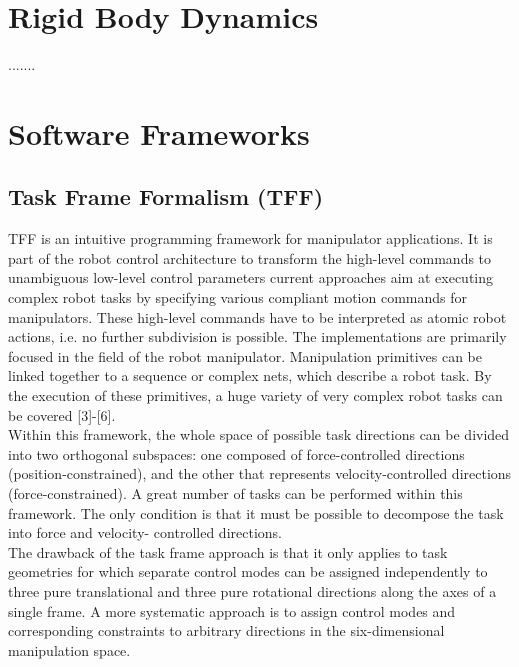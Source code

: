 \section{Rigid Body Dynamics}{.......}

\section{Software Frameworks}

\subsection{Task Frame Formalism (TFF)}

TFF is an intuitive programming framework for manipulator applications. It is part of the robot control architecture to transform the high-level commands to unambiguous low-level control parameters current approaches aim at executing complex robot tasks by specifying various compliant motion commands for manipulators. These high-level commands have to be interpreted as atomic robot actions, i.e. no further subdivision is possible. The implementations are primarily focused in the field of the robot manipulator. Manipulation primitives can be linked together to a sequence or complex nets, which describe a robot task. By the execution of these primitives, a huge variety of very complex robot tasks can be covered [3]-[6]. \\ 
Within this framework, the whole space of possible task directions can be divided into two orthogonal subspaces: one composed of force-controlled directions (position-constrained), and the other that represents velocity-controlled directions (force-constrained). A great number of tasks can be performed within this framework. The only condition is that it must be possible to decompose the task into force and velocity- controlled directions. \\ 

The drawback of the task frame approach is that it only applies to task geometries for which separate control modes can be assigned independently to three pure translational and three pure rotational directions along the axes of a single frame. A more systematic approach is to assign control modes and corresponding constraints to arbitrary directions in the six-dimensional manipulation space.

